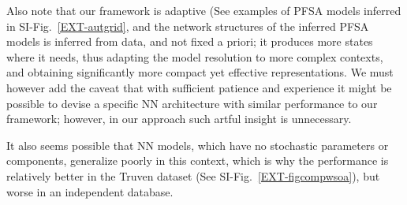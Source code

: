 \documentclass[onecolumn,,10pt]{IEEEtran}
\begin{document}
 Also note that our framework is adaptive (See examples of PFSA models inferred in SI-Fig.~\ref{EXT-autgrid}, and the network structures of the inferred PFSA models is inferred from data, and not fixed a priori; it produces more states where it needs, thus adapting the model resolution to more complex contexts, and obtaining significantly more compact yet effective representations. We must however add the caveat that with sufficient patience and experience it might be possible to devise a specific NN architecture with similar performance to our framework; however, in our approach such artful insight is unnecessary. 

It also seems possible that NN models, which have no stochastic parameters or components, generalize poorly in this context, which is why the performance is relatively better in the Truven dataset (See SI-Fig.~\ref{EXT-figcompwsoa}), but worse in an independent database.
\end{document}
